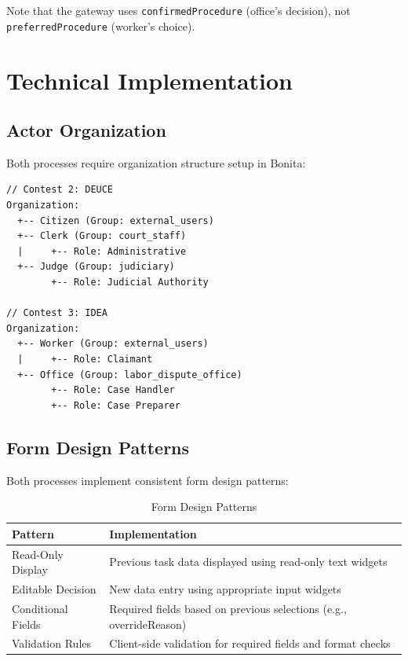 \documentclass[12pt,a4paper]{article}
\begin{document}
Note that the gateway uses \texttt{confirmedProcedure} (office's decision), not \texttt{preferredProcedure} (worker's choice).

\section{Technical Implementation}

\subsection{Actor Organization}

Both processes require organization structure setup in Bonita:

\begin{lstlisting}[caption=Organization Structure]
// Contest 2: DEUCE
Organization:
  +-- Citizen (Group: external_users)
  +-- Clerk (Group: court_staff)
  |     +-- Role: Administrative
  +-- Judge (Group: judiciary)
        +-- Role: Judicial Authority

// Contest 3: IDEA
Organization:
  +-- Worker (Group: external_users)
  |     +-- Role: Claimant
  +-- Office (Group: labor_dispute_office)
        +-- Role: Case Handler
        +-- Role: Case Preparer
\end{lstlisting}

\subsection{Form Design Patterns}

Both processes implement consistent form design patterns:

\begin{table}[H]
\centering
\caption{Form Design Patterns}
\begin{tabular}{lp{9cm}}
\toprule
\textbf{Pattern} & \textbf{Implementation} \\
\midrule
Read-Only Display & Previous task data displayed using read-only text widgets \\
Editable Decision & New data entry using appropriate input widgets \\
Conditional Fields & Required fields based on previous selections (e.g., overrideReason) \\
Validation Rules & Client-side validation for required fields and format checks \\
\bottomrule
\end{tabular}
\label{tab:form_patterns}
\end{table}
\end{document}
